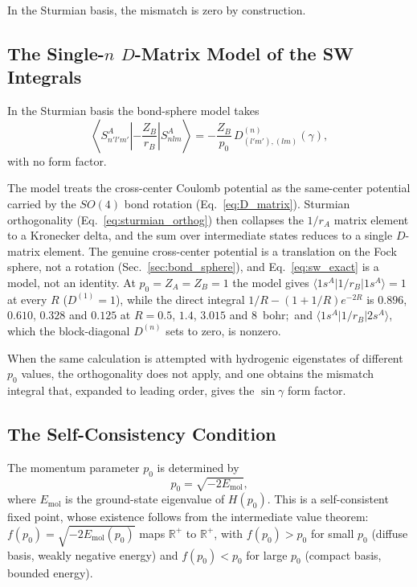 \documentclass[aps,pra,twocolumn,superscriptaddress,longbibliography]{revtex4-2}
\theoremstyle{remark}
\theoremstyle{plain}
\begin{document}
In the Sturmian basis, the mismatch is zero by construction.

\subsection{The Single-$n$ $D$-Matrix Model of the SW Integrals}

In the Sturmian basis the bond-sphere model takes
\begin{equation}
\left\langle S^A_{n'l'm'}\left| -\frac{Z_B}{r_B}\right|
S^A_{nlm}\right\rangle
= -\frac{Z_B}{p_0}\, D^{(n)}_{(l'm'),(lm)}(\gamma),
\label{eq:sw_exact}
\end{equation}
with no form factor.

The model treats the cross-center Coulomb potential as the
same-center potential carried by the $SO(4)$ bond rotation
(Eq.~\eqref{eq:D_matrix}).  Sturmian orthogonality
(Eq.~\eqref{eq:sturmian_orthog}) then collapses the $1/r_A$ matrix
element to a Kronecker delta, and the sum over intermediate states
reduces to a single $D$-matrix element.  The genuine cross-center
potential is a translation on the Fock sphere, not a rotation
(Sec.~\ref{sec:bond_sphere}), and Eq.~\eqref{eq:sw_exact} is a model,
not an identity.  At $p_0 = Z_A = Z_B = 1$ the model gives
$\langle 1s^A|1/r_B|1s^A\rangle = 1$ at every $R$ ($D^{(1)} = 1$), while
the direct integral $1/R - (1+1/R)e^{-2R}$ is $0.896$, $0.610$, $0.328$
and $0.125$ at $R = 0.5$, $1.4$, $3.015$ and $8$~bohr;\ and
$\langle 1s^A|1/r_B|2s^A\rangle$, which the block-diagonal $D^{(n)}$ sets
to zero, is nonzero.

When the same calculation is attempted with hydrogenic eigenstates of
different $p_0$ values, the orthogonality does not apply, and one
obtains the mismatch integral that, expanded to leading order, gives
the $\sin\gamma$ form factor.

\subsection{The Self-Consistency Condition}

The momentum parameter $p_0$ is determined by
\begin{equation}
p_0 = \sqrt{-2E_{\text{mol}}},
\label{eq:self_consistency}
\end{equation}
where $E_{\text{mol}}$ is the ground-state eigenvalue of $H(p_0)$.
This is a self-consistent fixed point, whose existence follows from
the intermediate value theorem: $f(p_0) = \sqrt{-2E_{\text{mol}}(p_0)}$
maps $\mathbb{R}^+$ to $\mathbb{R}^+$, with $f(p_0) > p_0$ for
small $p_0$ (diffuse basis, weakly negative energy) and $f(p_0) < p_0$
for large $p_0$ (compact basis, bounded energy).
\end{document}
